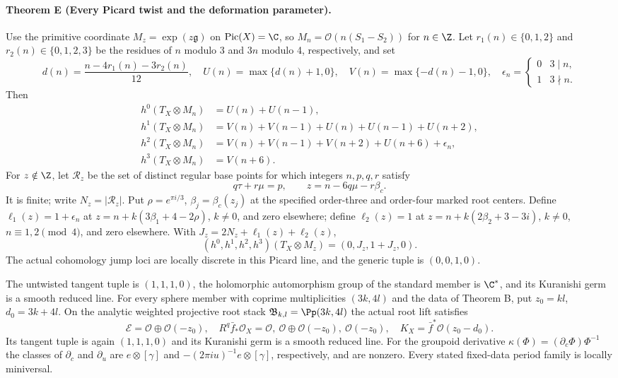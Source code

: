 \paragraph{Theorem E (Every Picard twist and the deformation parameter).}
\label{series:I:E}
Use the primitive coordinate $M_z=\exp(z\mathfrak g)$ on
$\operatorname{Pic}(X)=\C$, so
$M_n=\mathcal O(n(S_1-S_2))$ for $n\in\Z$.
Let $r_1(n)\in\{0,1,2\}$ and $r_2(n)\in\{0,1,2,3\}$ be the
residues of $n$ modulo 3 and $3n$ modulo 4, respectively, and set
\[
 d(n)=\frac{n-4r_1(n)-3r_2(n)}{12},\quad
 U(n)=\max\{d(n)+1,0\},\quad V(n)=\max\{-d(n)-1,0\},
 \quad\epsilon_n=\begin{cases}0&3\mid n,\\1&3\nmid n.\end{cases}
\]
Then
\[
\begin{aligned}
h^0(T_X\otimes M_n)&=U(n)+U(n-1),\\
h^1(T_X\otimes M_n)&=V(n)+V(n-1)+U(n)+U(n-1)+U(n+2),\\
h^2(T_X\otimes M_n)&=V(n)+V(n-1)+V(n+2)+U(n+6)+\epsilon_n,\\
h^3(T_X\otimes M_n)&=V(n+6).
\end{aligned}
\]
For $z\notin\Z$, let $\mathcal R_z$ be the set of distinct
regular base points for which integers $n,p,q,r$ satisfy
\[
 q\tau+r\mu=p,\qquad z=n-6q\mu-r\beta_c.
\]
It is finite; write $N_z=|\mathcal R_z|$.  Put
$\rho=e^{\pi i/3}$, $\beta_j=\beta_c(z_j)$ at the specified
order-three and order-four marked root centers.  Define
$\ell_1(z)=1+\epsilon_n$ at
$z=n+k(3\beta_1+4-2\rho)$, $k\ne0$, and zero elsewhere;
define $\ell_2(z)=1$ at
$z=n+k(2\beta_2+3-3i)$, $k\ne0$, $n\equiv1,2\pmod4$,
and zero elsewhere.  With
$J_z=2N_z+\ell_1(z)+\ell_2(z)$,
\[
 (h^0,h^1,h^2,h^3)(T_X\otimes M_z)=(0,J_z,1+J_z,0).
\]
The actual cohomology jump loci are locally discrete in this
Picard line, and the generic tuple is $(0,0,1,0)$.

The untwisted tangent tuple is $(1,1,1,0)$, the holomorphic
automorphism group of the standard member is $\C^*$, and its
Kuranishi germ is a smooth reduced line.  For every sphere member
with coprime multiplicities $(3k,4l)$ and the data of Theorem B,
put $z_0=kl$, $d_0=3k+4l$.  On the analytic weighted projective root stack
$\mathfrak B_{k,l}=\Pp(3k,4l)$ the actual root lift satisfies
\[
 \mathcal E=\mathcal O\oplus\mathcal O(-z_0),\quad
 R^q\bar f_*\mathcal O_X=
 \mathcal O,\ \mathcal O\oplus\mathcal O(-z_0),\ \mathcal O(-z_0),
 \quad K_X=\bar f^*\mathcal O(z_0-d_0).
\]
Its tangent tuple is again $(1,1,1,0)$ and its Kuranishi germ is
a smooth reduced line.  For the groupoid derivative
$\kappa(\Phi)=(\partial_c\Phi)\Phi^{-1}$ the classes of
$\partial_c$ and $\partial_u$ are
$e\otimes[\gamma]$ and $-(2\pi i u)^{-1}e\otimes[\gamma]$,
respectively, and are nonzero.  Every stated fixed-data period
family is locally miniversal.

